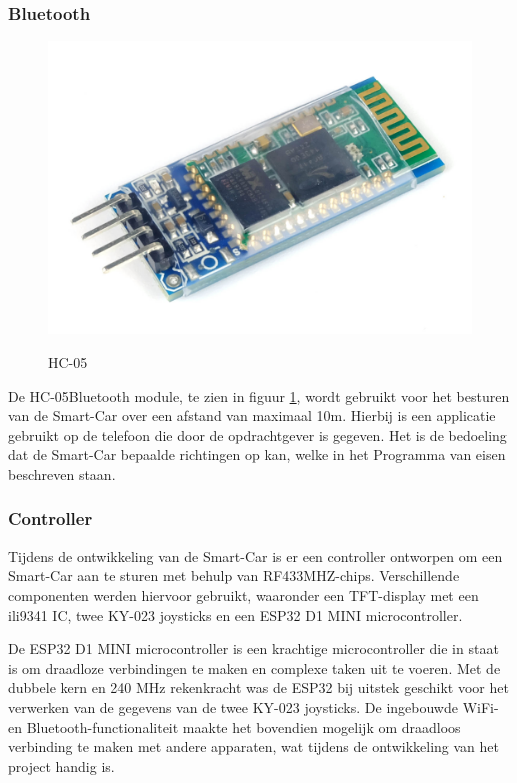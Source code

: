 \subsubsection{Bluetooth}\begin{figure}[h]
    \centering
    \includegraphics[scale = 0.08]{Media/Figuren/HC-05_hardware.jpg}
    \caption{HC-05}
    \label{HC-05}
    \cite{HC-05-image-fysiek-RL} 
\end{figure}

De HC-05\gls{Bluetooth} module, te zien in figuur \ref{HC-05}\cite{HC-05-image-fysiek-RL}, wordt gebruikt voor het besturen van de \gls{Smart-Car} over een afstand van maximaal 10m. Hierbij is een applicatie gebruikt op de telefoon die door de opdrachtgever is gegeven. Het is de bedoeling dat de \gls{Smart-Car} bepaalde richtingen op kan, welke in het Programma van eisen beschreven staan. 
\subsubsection{Controller}
Tijdens de ontwikkeling van de \gls{Smart-Car} is er een controller ontworpen om een \gls{Smart-Car} aan te sturen met behulp van \gls{RF433MHZ}-chips. Verschillende componenten werden hiervoor gebruikt, waaronder een \gls{TFT-display} met een \gls{ili9341}\cite{ILI3941} IC, twee KY-023 joysticks en een ESP32\cite{ESP32} D1 MINI \gls{microcontroller}.

De ESP32\cite{ESP32} D1 MINI \gls{microcontroller} is een krachtige \gls{microcontroller} die in staat is om draadloze verbindingen te maken en complexe taken uit te voeren. Met de dubbele kern en 240 MHz rekenkracht was de ESP32\cite{ESP32} bij uitstek geschikt voor het verwerken van de gegevens van de twee KY-023 joysticks. De ingebouwde WiFi- en \gls{Bluetooth}-functionaliteit maakte het bovendien mogelijk om draadloos verbinding te maken met andere apparaten, wat tijdens de ontwikkeling van het project handig is.


